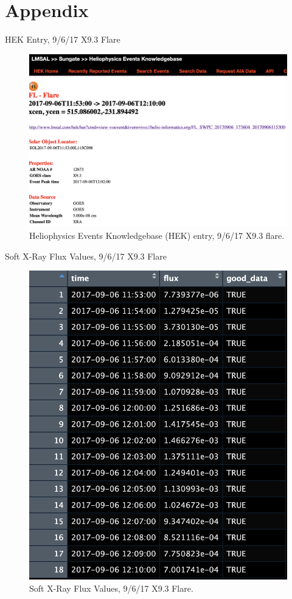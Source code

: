 \documentclass{beamer}
\begin{document}
\section{Appendix}

\begin{frame}{HEK Entry, 9/6/17 X9.3 Flare}
    \begin{figure}
        \centering
        \includegraphics[scale=0.3]{hek_entry_20170906.png}
        \caption{Heliophysics Events Knowledgebase (HEK) entry, 9/6/17 X9.3 flare.}
        \label{fig:hek_entry}
    \end{figure}
\end{frame}

\begin{frame}{Soft X-Ray Flux Values, 9/6/17 X9.3 Flare}
    \begin{figure}
        \centering
        \includegraphics[scale=0.4]{flux_vals_20170906.png}
        \caption{Soft X-Ray Flux Values, 9/6/17 X9.3 Flare.}
        \label{fig:flux_vals_20170906}
    \end{figure}
\end{frame}
\end{document}
